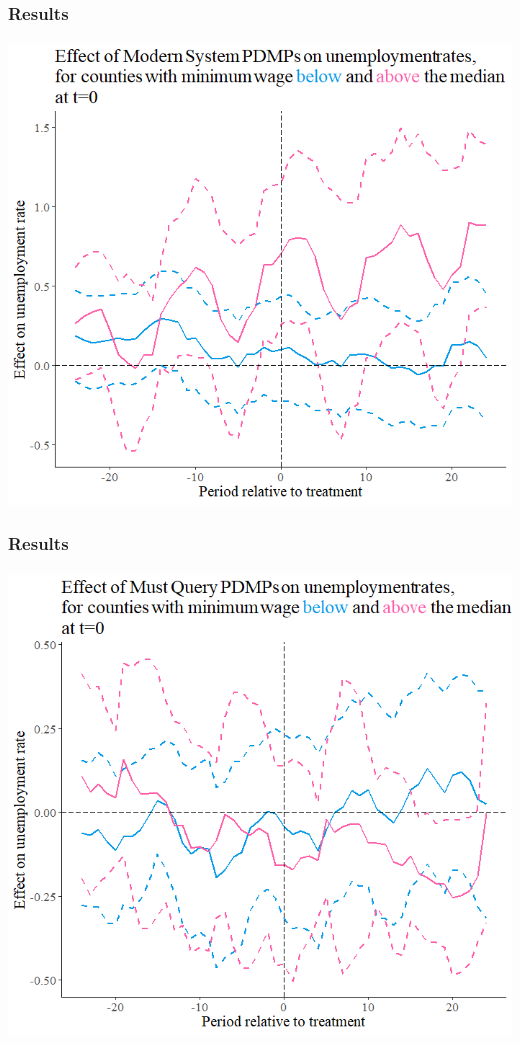 \begin{frame}

    \frametitle{Results} %
    \framesubtitle{}  %
    \rmfamily %
    
    \begin{center}
        \includegraphics[scale=0.45]{mop_effects.png}
    \end{center}

\end{frame}


\begin{frame}

    \frametitle{Results} %
    \framesubtitle{}  %
    \rmfamily %
    
    \begin{center}
        \includegraphics[scale=0.45]{pmq_effects.png}
    \end{center}

\end{frame}


